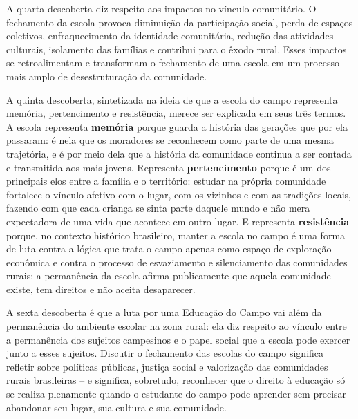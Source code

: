 \documentclass[
  12pt,
  openright,
  twoside,
  a4paper,
  english,
  brazilian,
  sumario=tradicional
]{abntex2}
\begin{document}
A quarta descoberta diz respeito aos impactos no vínculo comunitário. O fechamento da escola provoca diminuição da participação social, perda de espaços coletivos, enfraquecimento da identidade comunitária, redução das atividades culturais, isolamento das famílias e contribui para o êxodo rural. Esses impactos se retroalimentam e transformam o fechamento de uma escola em um processo mais amplo de desestruturação da comunidade.

A quinta descoberta, sintetizada na ideia de que a escola do campo representa memória, pertencimento e resistência, merece ser explicada em seus três termos. A escola representa \textbf{memória} porque guarda a história das gerações que por ela passaram: é nela que os moradores se reconhecem como parte de uma mesma trajetória, e é por meio dela que a história da comunidade continua a ser contada e transmitida aos mais jovens. Representa \textbf{pertencimento} porque é um dos principais elos entre a família e o território: estudar na própria comunidade fortalece o vínculo afetivo com o lugar, com os vizinhos e com as tradições locais, fazendo com que cada criança se sinta parte daquele mundo e não mera expectadora de uma vida que acontece em outro lugar. E representa \textbf{resistência} porque, no contexto histórico brasileiro, manter a escola no campo é uma forma de luta contra a lógica que trata o campo apenas como espaço de exploração econômica e contra o processo de esvaziamento e silenciamento das comunidades rurais: a permanência da escola afirma publicamente que aquela comunidade existe, tem direitos e não aceita desaparecer.

A sexta descoberta é que a luta por uma Educação do Campo vai além da permanência do ambiente escolar na zona rural: ela diz respeito ao vínculo entre a permanência dos sujeitos campesinos e o papel social que a escola pode exercer junto a esses sujeitos. Discutir o fechamento das escolas do campo significa refletir sobre políticas públicas, justiça social e valorização das comunidades rurais brasileiras -- e significa, sobretudo, reconhecer que o direito à educação só se realiza plenamente quando o estudante do campo pode aprender sem precisar abandonar seu lugar, sua cultura e sua comunidade.


\postextual


\end{document}
